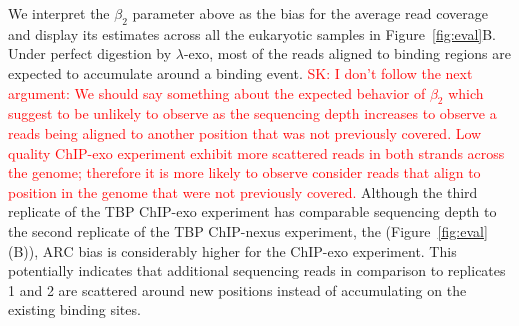 \documentclass{bmcart}
\newcommand{\SK}[1]{\textcolor{red}{SK: #1}}
\begin{document}
We interpret the $\beta_2$ parameter above as the bias for the average read coverage  and display its estimates across all the eukaryotic samples in Figure~\ref{fig:eval}B.
 Under perfect digestion by $\lambda$-exo, most of the reads aligned to binding regions are expected to accumulate
 around a binding event.  
 \SK{I don't follow the next argument: We should say something about the expected behavior of $\beta_2$
 which suggest to be unlikely to
observe as the sequencing depth increases to observe a reads being
aligned to another position that was not previously covered. Low
quality ChIP-exo experiment exhibit more scattered reads in both
strands across the genome; therefore it is more likely to observe
consider reads that align to position in the genome that were not
previously covered. }
Although the 
third replicate of the TBP ChIP-exo experiment has comparable sequencing depth to the 
second replicate of the TBP ChIP-nexus experiment, the  
(Figure~\ref{fig:eval}(B)), $\mbox{ARC}$ bias is considerably higher for the ChIP-exo experiment.
This potentially indicates that additional sequencing reads in comparison to replicates 1 and 2 are scattered around new positions instead of accumulating on the existing binding sites.
\end{document}
